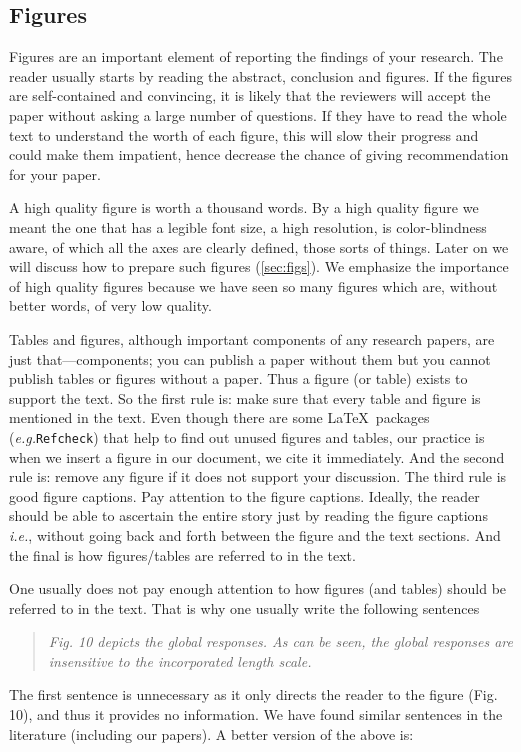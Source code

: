 \documentclass[authoryear,12pta4paper,fleqn]{article}
\newcommand{\eg}{\textit{e.g.}\xspace}
\newcommand{\ie}{\textit{i.e.},\xspace}
\numberwithin{equation}{section}
\theoremstyle{remark}
\begin{document}
\subsection{Figures}\label{sec:citing-figs}

Figures  are  an important element of reporting the findings of your research. The reader usually starts by reading the abstract, conclusion and figures. If the figures are self-contained and convincing, it is likely that the reviewers will accept the paper without asking a large number of questions. If they have to read the whole text to understand the worth of each figure, this will slow their progress and could make them impatient, hence decrease the chance of giving recommendation for your paper. 

A high quality figure is worth a thousand words. By a high quality figure we meant the one that has a legible font size, a high resolution, is color-blindness aware, of which all the axes are clearly defined, those sorts of things. Later on we will discuss how to prepare such figures (\cref{sec:figs}). We emphasize the importance of high quality figures because we have seen so many figures which are, without better words, of very low quality.

Tables and figures, although important components of any research papers, are just that—components; you can publish a paper without them but you cannot publish tables or figures without a paper. Thus a figure (or table) exists to support the text. So the first rule is: make sure that every table and figure is mentioned in the text. Even though there are some \LaTeX\ packages (\eg \texttt{Refcheck}) that help to find out unused figures and tables, our practice is when we insert a figure in our document, we cite it immediately. And the second rule is: remove any figure if it does not support your discussion. The third rule is good figure captions. Pay attention to the figure captions. Ideally, the reader should be able to ascertain the entire story just by reading the figure captions \ie without going back and forth between the figure and the text sections. And the final is how figures/tables are referred to in the text.

One usually does not pay enough attention to how figures (and tables) should be referred to in the text. That is why one usually write the following sentences

 \begin{quote}
  \textit{Fig. 10 depicts the global responses. As can be seen, the global responses are 
  insensitive to the incorporated length scale.}
 \end{quote}
The first sentence is unnecessary as it only directs the reader to the figure (Fig. 10), and thus it provides no information. We have found similar sentences in the literature (including our papers). A better version of the above is:
\end{document}
